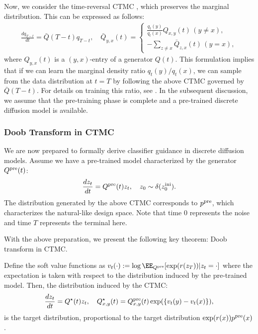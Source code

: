 Now, we consider the time-reversal CTMC \citep{sun2022score}, which preserves the marginal distribution. This can be expressed as follows: 
\begin{align*}
    \frac{dq_{T-t}}{dt} = \bar Q(T-t)q_{T-t},\quad \bar Q_{y,x}(t) = \begin{cases}
     \textstyle    \frac{q_t(y)}{q_t(x)} Q_{x,y}(t)\,(y \neq x), \\ 
    \textstyle     -\sum_{z\neq x} \bar Q_{z,x}(t)\,(y=x), 
    \end{cases} 
\end{align*}
where $Q_{y,x}(t)$ is a $(y,x)$-entry of a generator $Q(t)$. This formulation implies that if we can learn the marginal density ratio $q_t(y)/q_t(x)$, we can sample from the data distribution at $t=T$ by following the above CTMC governed by $\bar Q(T-t)$. For details on training this ratio, see \citet{lou2023discrete}. In the subsequent discussion, we assume that the pre-training phase is complete and a pre-trained discrete diffusion model is available.

\subsubsection{Doob Transform in CTMC}

We are now prepared to formally derive classifier guidance in discrete diffusion models. Assume we have a pre-trained model characterized by the generator $Q^{\mathrm{pre}}(t)$: 
\begin{align*} \frac{dz_t}{dt} = Q^{\mathrm{pre}}(t)z_t, \quad z_0 \sim \delta(z^\mathrm{ini}_0). \end{align*}
The distribution generated by the above CTMC corresponds to $p^{\mathrm{pre}}$, which characterizes the natural-like design space. Note that time $0$ represents the noise and time $T$ represents the terminal here. 

With the above preparation, we present the following key theorem: Doob transform in CTMC. 

\begin{Thmbox}{}
\begin{theorem}\label{thm:doob2}
Define the soft value functions as $v_t(\cdot):=\log \EE_{Q^{\pre}}[\exp(r(z_T))|z_t=\cdot] $ where the expectation is taken with respect to the distribution induced by the pre-trained model. Then, the distribution induced by the CTMC: 
\begin{align}\label{eq:doob_CTMC}
    \frac{dz_t}{dt} = Q^{\star}(t)z_t,\quad  Q^{\star}_{x,y}(t) = Q^{\mathrm{pre}}_{x,y}(t)\exp(\{v_t(y)-v_t(x)\}), 
\end{align}
is the target distribution, proportional to the target distribution $\exp(r(x))p^{\mathrm{pre}}(x)$. 
\end{theorem}
\end{Thmbox}

